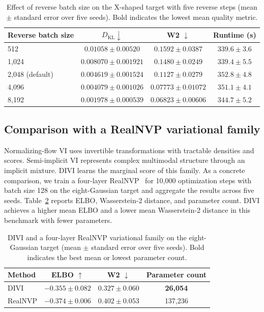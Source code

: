 \begin{table}[!htbp]
\centering
\caption{Effect of reverse batch size on the X-shaped target with five reverse steps (mean $\pm$ standard error over five seeds). Bold indicates the lowest mean quality metric.}
\label{tab:reverse-batch-size}
\small
\begin{tabular}{lccc}
\toprule
Reverse batch size & $D_{\mathrm{KL}}\downarrow$ & W2 $\downarrow$ & Runtime (s) \\
\midrule
512 & $0.01058\pm0.00520$ & $0.1592\pm0.0387$ & $339.6\pm3.6$ \\
1,024 & $0.008070\pm0.001921$ & $0.1480\pm0.0249$ & $339.4\pm5.5$ \\
2,048 (default) & $0.004619\pm0.001524$ & $0.1127\pm0.0279$ & $352.8\pm4.8$ \\
4,096 & $0.004079\pm0.001026$ & $0.07773\pm0.01072$ & $351.1\pm4.1$ \\
8,192 & $\mathbf{0.001978\pm0.000539}$ & $\mathbf{0.06823\pm0.00606}$ & $344.7\pm5.2$ \\
\bottomrule
\end{tabular}
\end{table}

\subsection{Comparison with a RealNVP variational family}
\label{app:flow-comparison}

Normalizing-flow VI uses invertible transformations with tractable densities and scores. Semi-implicit VI represents complex multimodal structure through an implicit mixture. DIVI learns the marginal score of this family. As a concrete comparison, we train a four-layer RealNVP~\citep{dinh2016density} for 10,000 optimization steps with batch size 128 on the eight-Gaussian target and aggregate the results across five seeds. Table~\ref{tab:realnvp-comparison} reports ELBO, Wasserstein-2 distance, and parameter count. DIVI achieves a higher mean ELBO and a lower mean Wasserstein-2 distance in this benchmark with fewer parameters.

\begin{table}[!htbp]
\centering
\caption{DIVI and a four-layer RealNVP variational family on the eight-Gaussian target (mean $\pm$ standard error over five seeds). Bold indicates the best mean or lowest parameter count.}
\label{tab:realnvp-comparison}
\small
\begin{tabular}{lccc}
\toprule
Method & ELBO $\uparrow$ & W2 $\downarrow$ & Parameter count \\
\midrule
DIVI & $\mathbf{-0.355\pm0.082}$ & $\mathbf{0.327\pm0.060}$ & \textbf{26,054} \\
RealNVP & $-0.374\pm0.006$ & $0.402\pm0.053$ & 137,236 \\
\bottomrule
\end{tabular}
\end{table}

